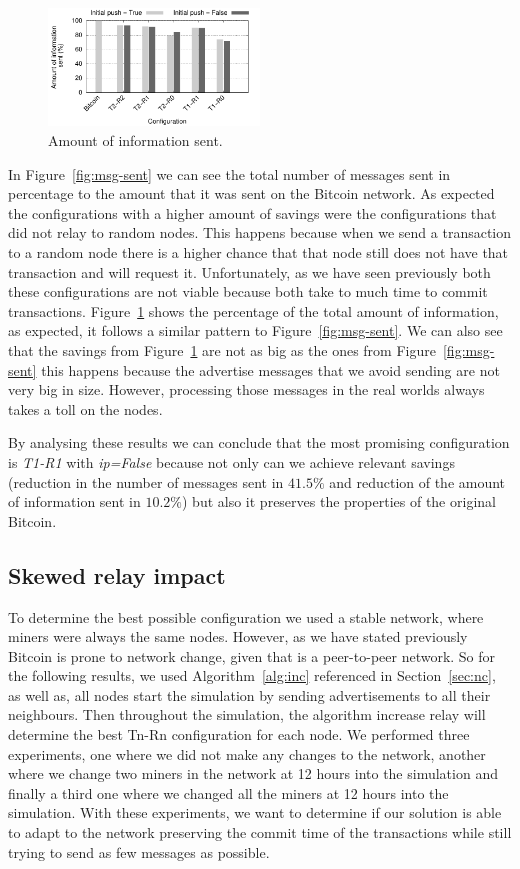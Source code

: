 \documentclass{dads}   %
\begin{document}
\begin{figure}[t]
\centering
\includegraphics[width=0.5\textwidth]{plots/mb-sent.pdf}
\caption{Amount of information sent.}
\label{fig:mb-sent}
\end{figure}

In Figure~\ref{fig:msg-sent} we can see the total number of messages sent in percentage to the amount that it was sent on the Bitcoin network. As expected the configurations with a higher amount of savings were the configurations that did not relay to random nodes. This happens because when we send a transaction to a random node there is a higher chance that that node still does not have that transaction and will request it. Unfortunately, as we have seen previously both these configurations are not viable because both take to much time to commit transactions. Figure~\ref{fig:mb-sent} shows the percentage of the total amount of information, as expected, it follows a similar pattern to Figure~\ref{fig:msg-sent}. We can also see that the savings from Figure~\ref{fig:mb-sent} are not as big as the ones from Figure~\ref{fig:msg-sent} this happens because the advertise messages that we avoid sending are not very big in size. However, processing those messages in the real worlds always takes a toll on the nodes.

By analysing these results we can conclude that the most promising configuration is \textsl{T1-R1} with \textsl{ip=False} because not only can we achieve relevant savings (reduction in the number of messages sent in $41.5\%$ and reduction of the amount of information sent in $10.2\%$) but also it preserves the properties of the original Bitcoin.
\vspace{-1.5mm}
\subsection{Skewed relay impact}
To determine the best possible configuration we used a stable network, where miners were always the same nodes. However, as we have stated previously Bitcoin is prone to network change, given that is a peer-to-peer network. So for the following results, we used Algorithm~\ref{alg:inc} referenced in Section~\ref{sec:nc}, as well as, all nodes start the simulation by sending advertisements to all their neighbours. Then throughout the simulation, the algorithm increase relay will determine the best Tn-Rn configuration for each node. We performed three experiments, one where we did not make any changes to the network, another where we change two miners in the network at 12 hours into the simulation and finally a third one where we changed all the miners at 12 hours into the simulation. With these experiments, we want to determine if our solution is able to adapt to the network preserving the commit time of the transactions while still trying to send as few messages as possible.
\end{document}
